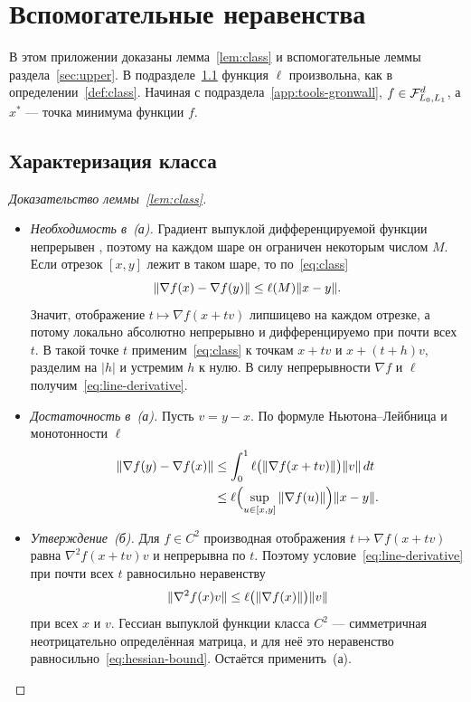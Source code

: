 \section{Вспомогательные неравенства}\label{app:tools}

В этом приложении доказаны лемма~\ref{lem:class} и вспомогательные леммы раздела~\ref{sec:upper}. В подразделе~\ref{app:tools-class} функция $\ell$ произвольна, как в определении~\ref{def:class}. Начиная с подраздела~\ref{app:tools-gronwall}, $f\in\mathcal F_{L_0,L_1}^d$, а $x^\ast$ --- точка минимума функции $f$.

\subsection{Характеризация класса}\label{app:tools-class}

\begin{proof}[Доказательство леммы~\ref{lem:class}]
\leavevmode
\begin{itemize}
\item \emph{Необходимость в~(а).} Градиент выпуклой дифференцируемой функции непрерывен \citep[теорема~25.5]{rockafellar1970convex}, поэтому на каждом шаре он ограничен некоторым числом $M$. Если отрезок $[x,y]$ лежит в таком шаре, то по~\eqref{eq:class}
\[
 \|\nabla f(x)-\nabla f(y)\|\le\ell(M)\|x-y\| .
\]
Значит, отображение $t\mapsto\nabla f(x+tv)$ липшицево на каждом отрезке, а потому локально абсолютно непрерывно и дифференцируемо при почти всех $t$. В такой точке $t$ применим~\eqref{eq:class} к точкам $x+tv$ и $x+(t+h)v$, разделим на $|h|$ и устремим $h$ к нулю. В силу непрерывности $\nabla f$ и $\ell$ получим~\eqref{eq:line-derivative}.
\item \emph{Достаточность в~(а).} Пусть $v=y-x$. По формуле Ньютона--Лейбница и монотонности $\ell$
\begin{align*}
 \|\nabla f(y)-\nabla f(x)\|
 &\le\int_0^1\ell\bigl(\|\nabla f(x+tv)\|\bigr)\|v\|\,dt\\
 &\le\ell\Bigl(\sup_{u\in[x,y]}\|\nabla f(u)\|\Bigr)\|x-y\| .
\end{align*}
\item \emph{Утверждение~(б).} Для $f\in C^2$ производная отображения $t\mapsto\nabla f(x+tv)$ равна $\nabla^2f(x+tv)v$ и непрерывна по $t$. Поэтому условие~\eqref{eq:line-derivative} при почти всех $t$ равносильно неравенству
\[
 \|\nabla^2f(x)v\|\le\ell\bigl(\|\nabla f(x)\|\bigr)\|v\|
\]
при всех $x$ и $v$. Гессиан выпуклой функции класса $C^2$ --- симметричная неотрицательно определённая матрица, и для неё это неравенство равносильно~\eqref{eq:hessian-bound}. Остаётся применить~(а).\qedhere
\end{itemize}
\end{proof}

